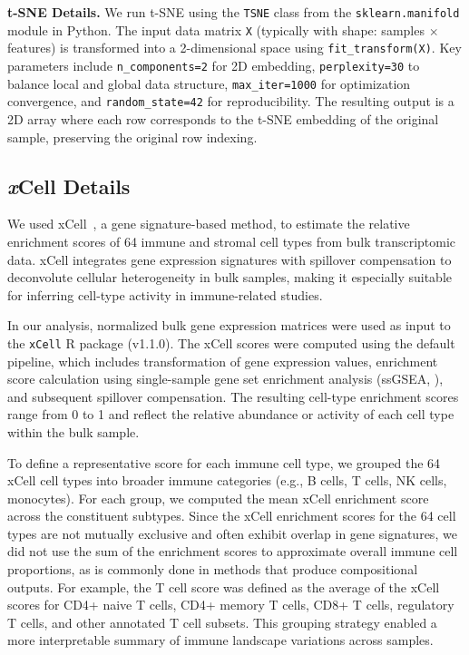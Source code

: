 \documentclass[
  12pt]{article}
\begin{document}
\textbf{t-SNE Details.} We run t-SNE using the \texttt{TSNE} class from the \texttt{sklearn.manifold} \citep{scikit-learn} module in Python. The input data matrix \texttt{X} (typically with shape: samples $\times$ features) is transformed into a 2-dimensional space using \texttt{fit\_transform(X)}. Key parameters include \texttt{n\_components=2} for 2D embedding, \texttt{perplexity=30} to balance local and global data structure, \texttt{max\_iter=1000} for optimization convergence, and \texttt{random\_state=42} for reproducibility. The resulting output is a 2D array where each row corresponds to the t-SNE embedding of the original sample, preserving the original row indexing.

\subsection{\textit{x}Cell Details}
We used xCell~\citep{aran2017xcell}, a gene signature-based method, to estimate the relative enrichment scores of 64 immune and stromal cell types from bulk transcriptomic data. xCell integrates gene expression signatures with spillover compensation to deconvolute cellular heterogeneity in bulk samples, making it especially suitable for inferring cell-type activity in immune-related studies.

In our analysis, normalized bulk gene expression matrices were used as input to the \texttt{xCell} R package (v1.1.0). The xCell scores were computed using the default pipeline, which includes transformation of gene expression values, enrichment score calculation using single-sample gene set enrichment analysis (ssGSEA, \citealp{barbie2009systematic}), and subsequent spillover compensation. The resulting cell-type enrichment scores range from 0 to 1 and reflect the relative abundance or activity of each cell type within the bulk sample.

To define a representative score for each immune cell type, we grouped the 64 xCell cell types into broader immune categories (e.g., B cells, T cells, NK cells, monocytes). For each group, we computed the mean xCell enrichment score across the constituent subtypes. Since the xCell enrichment scores for the 64 cell types are not mutually exclusive and often exhibit overlap in gene signatures, we did not use the sum of the enrichment scores to approximate overall immune cell proportions, as is commonly done in methods that produce compositional outputs. For example, the T cell score was defined as the average of the xCell scores for CD4+ naive T cells, CD4+ memory T cells, CD8+ T cells, regulatory T cells, and other annotated T cell subsets. This grouping strategy enabled a more interpretable summary of immune landscape variations across samples.
\end{document}
